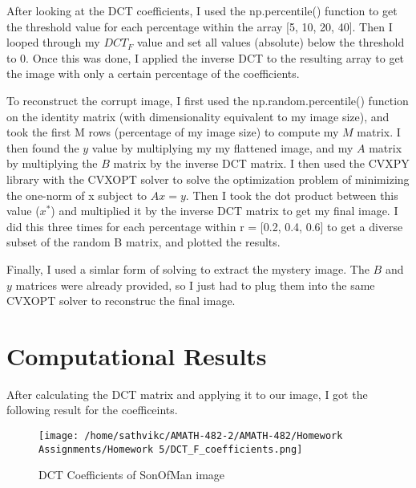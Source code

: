 \documentclass[11pt]{amsart}
\begin{document}
After looking at the DCT coefficients, I used the np.percentile() function to get the 
threshold value for each percentage within the array [5, 10, 20, 40]. Then I looped through 
my $DCT_F$ value and set all values (absolute) below the threshold to 0. Once this 
was done, I applied the inverse DCT to the resulting array to get the 
image with only a certain percentage of the coefficients. 

To reconstruct the corrupt image, I first used the np.random.percentile() function on the 
identity matrix (with dimensionality equivalent to my image size), and took the first M rows 
(percentage of my image size) to compute my $M$ matrix. I then found the $y$ value by 
multiplying my my flattened image, and my $A$ matrix by multiplying the $B$ matrix by 
the inverse DCT matrix. I then used the CVXPY library with the CVXOPT solver to solve 
the optimization problem of minimizing the one-norm of x subject to $Ax = y$. Then I took 
the dot product between this value ($x^*$) and multiplied it by the inverse DCT matrix 
to get my final image. I did this three times for each percentage within r = [0.2, 0.4, 0.6] to get a diverse subset of 
the random B matrix, and plotted the results. 

Finally, I used a simlar form of solving to extract the mystery image. The $B$ and $y$ matrices
were already provided, so I just had to plug them into the same CVXOPT solver to reconstruc the final image. 




\section{Computational Results}\label{sec:results}

After calculating the DCT matrix and applying it to our image, I 
got the following result for the coefficeints. 

\begin{figure}[H]
    \centering
    \texttt{[image: /home/sathvikc/AMATH-482-2/AMATH-482/Homework Assignments/Homework 5/DCT\_F\_coefficients.png]}
    \caption{DCT Coefficients of SonOfMan image}
    \label{fig:DCTCoef}
\end{figure}
\end{document}
